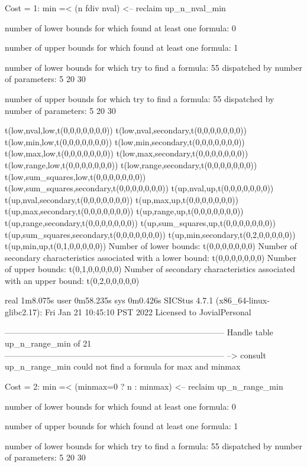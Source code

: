 Cost =  1:  min =< (n fdiv nval)
<-- reclaim up_n_nval_min

number of lower bounds for which found at least one formula: 0

number of upper bounds for which found at least one formula: 1

number of lower bounds for which try to find a formula: 55
dispatched by number of parameters: 5  20  30

number of upper bounds for which try to find a formula: 55
dispatched by number of parameters: 5  20  30

t(low,nval,low,t(0,0,0,0,0,0,0))
t(low,nval,secondary,t(0,0,0,0,0,0,0))
t(low,min,low,t(0,0,0,0,0,0,0))
t(low,min,secondary,t(0,0,0,0,0,0,0))
t(low,max,low,t(0,0,0,0,0,0,0))
t(low,max,secondary,t(0,0,0,0,0,0,0))
t(low,range,low,t(0,0,0,0,0,0,0))
t(low,range,secondary,t(0,0,0,0,0,0,0))
t(low,sum_squares,low,t(0,0,0,0,0,0,0))
t(low,sum_squares,secondary,t(0,0,0,0,0,0,0))
t(up,nval,up,t(0,0,0,0,0,0,0))
t(up,nval,secondary,t(0,0,0,0,0,0,0))
t(up,max,up,t(0,0,0,0,0,0,0))
t(up,max,secondary,t(0,0,0,0,0,0,0))
t(up,range,up,t(0,0,0,0,0,0,0))
t(up,range,secondary,t(0,0,0,0,0,0,0))
t(up,sum_squares,up,t(0,0,0,0,0,0,0))
t(up,sum_squares,secondary,t(0,0,0,0,0,0,0))
t(up,min,secondary,t(0,2,0,0,0,0,0))
t(up,min,up,t(0,1,0,0,0,0,0))
Number of lower bounds:                                             t(0,0,0,0,0,0,0)
Number of secondary characteristics associated with a lower bound:  t(0,0,0,0,0,0,0)
Number of upper bounds:                                             t(0,1,0,0,0,0,0)
Number of secondary characteristics associated with an upper bound: t(0,2,0,0,0,0,0)

real	1m8.075s
user	0m58.235s
sys	0m0.426s
SICStus 4.7.1 (x86_64-linux-glibc2.17): Fri Jan 21 10:45:10 PST 2022
Licensed to JovialPersonal


--------------------------------------------------------------------------------
Handle table up_n_range_min of 21
--------------------------------------------------------------------------------
--> consult up_n_range_min
could not find a formula for max and minmax

Cost =  2:  min =< (minmax=0 ? n : minmax)
<-- reclaim up_n_range_min

number of lower bounds for which found at least one formula: 0

number of upper bounds for which found at least one formula: 1

number of lower bounds for which try to find a formula: 55
dispatched by number of parameters: 5  20  30

